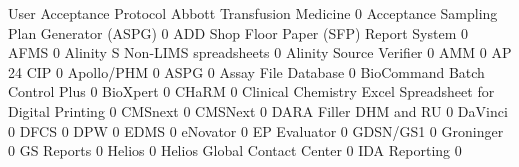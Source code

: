 \documentclass{article}
\begin{document}
\begin{Schunk}
\begin{Soutput}
                                                            User Acceptance Protocol
  Abbott Transfusion Medicine                                                      0
  Acceptance Sampling Plan Generator (ASPG)                                        0
  ADD Shop Floor Paper (SFP) Report System                                         0
  AFMS                                                                             0
  Alinity S Non-LIMS spreadsheets                                                  0
  Alinity Source Verifier                                                          0
  AMM                                                                              0
  AP 24 CIP                                                                        0
  Apollo/PHM                                                                       0
  ASPG                                                                             0
  Assay File Database                                                              0
  BioCommand Batch Control Plus                                                    0
  BioXpert                                                                         0
  CHaRM                                                                            0
  Clinical Chemistry Excel Spreadsheet for Digital Printing                        0
  CMSnext                                                                          0
  CMSNext                                                                          0
  DARA Filler DHM and RU                                                           0
  DaVinci                                                                          0
  DFCS                                                                             0
  DPW                                                                              0
  EDMS                                                                             0
  eNovator                                                                         0
  EP Evaluator                                                                     0
  GDSN/GS1                                                                         0
  Groninger                                                                        0
  GS Reports                                                                       0
  Helios                                                                           0
  Helios Global Contact Center                                                     0
  IDA Reporting                                                                    0

\end{Soutput}
\end{Schunk}
\end{document}
